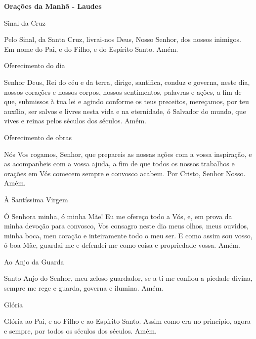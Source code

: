 \begin{center}
    \textbf{Orações da Manhã - Laudes}
\end{center}
\begin{center}
    Sinal da Cruz
\end{center}
\begin{flushleft}
    Pelo Sinal, \grecrossRed{} da Santa Cruz, livrai-nos Deus, \grecrossRed{} Nosso Senhor, dos nossos \grecrossRed{} inimigos. Em nome do Pai, \grecrossRed{} e do Filho, e do Espírito Santo. Amém.
\end{flushleft}
\begin{center}
    Oferecimento do dia
\end{center}
\begin{flushleft}
    Senhor Deus, Rei do céu e da terra, dirige, santifica, conduz e governa, neste dia, nossos corações e nossos corpos, nossos sentimentos, palavras e ações, a fim de que, submissos à tua lei e agindo conforme os teus preceitos, mereçamos, por teu auxílio, ser salvos e livres nesta vida e na eternidade, ó Salvador do mundo, que vives e reinas pelos séculos dos séculos. Amém.
\end{flushleft}
\begin{center}
    Oferecimento de obras
\end{center}
\begin{flushleft}
    Nós Vos rogamos, Senhor, que prepareis as nossas ações com a vossa inspiração, e as acompanheis com a vossa ajuda, a fim de que todos os nossos trabalhos e orações em Vós comecem sempre e convosco acabem. Por Cristo, Senhor Nosso. Amém.
\end{flushleft}
\begin{center}
    À Santíssima Virgem
\end{center}
\begin{flushleft}
    Ó Senhora minha, ó minha Mãe! Eu me ofereço todo a Vós, e, em prova da minha devoção para convosco, Vos consagro neste dia meus olhos, meus ouvidos, minha boca, meu coração e inteiramente todo o meu ser. E como assim sou vosso, ó boa Mãe, guardai-me e defendei-me como coisa e propriedade vossa. Amém.
\end{flushleft}
\begin{center}
    Ao Anjo da Guarda
\end{center}
\begin{flushleft}
    Santo Anjo do Senhor, meu zeloso guardador, se a ti me confiou a piedade divina, sempre me rege e guarda, governa e ilumina. Amém.
\end{flushleft}
\begin{center}
    Glória
\end{center}
\begin{flushleft}
    Glória ao Pai, e ao Filho e ao Espírito Santo. Assim como era no princípio, agora e sempre, por todos os séculos dos séculos. Amém.
\end{flushleft}
